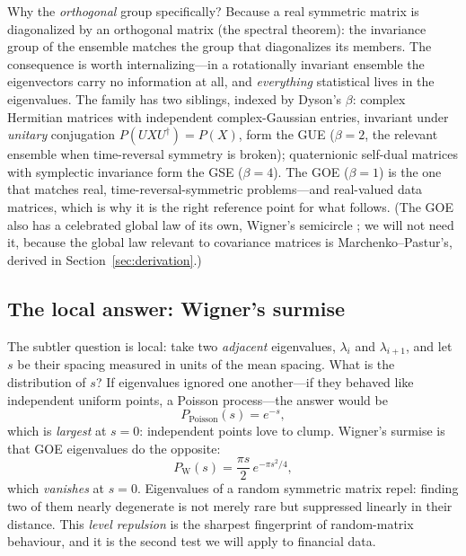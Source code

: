 \documentclass[11pt]{article}
\begin{document}
Why the \emph{orthogonal} group specifically? Because a real symmetric
matrix is diagonalized by an orthogonal matrix (the spectral theorem):
the invariance group of the ensemble matches the group that diagonalizes
its members. The consequence is worth internalizing---in a rotationally
invariant ensemble the eigenvectors carry no information at all, and
\emph{everything} statistical lives in the eigenvalues. The family has
two siblings, indexed by Dyson's $\beta$: complex Hermitian matrices with
independent complex-Gaussian entries, invariant under \emph{unitary}
conjugation $P(UXU^{\dagger})=P(X)$, form the GUE ($\beta=2$, the
relevant ensemble when time-reversal symmetry is broken); quaternionic
self-dual matrices with symplectic invariance form the GSE ($\beta=4$).
The GOE ($\beta=1$) is the one that matches real, time-reversal-symmetric
problems---and real-valued data matrices, which is why it is the right
reference point for what follows. (The GOE also has a celebrated global
law of its own, Wigner's semicircle \cite{wigner1958}; we will not need
it, because the global law relevant to covariance matrices is
Marchenko--Pastur's, derived in Section~\ref{sec:derivation}.)

\subsection{The local answer: Wigner's surmise}
\label{sec:surmise}

The subtler question is local: take two \emph{adjacent} eigenvalues,
$\lambda_{i}$ and $\lambda_{i+1}$, and let $s$ be their spacing measured in
units of the mean spacing. What is the distribution of $s$? If eigenvalues
ignored one another---if they behaved like independent uniform points, a
Poisson process---the answer would be
\begin{equation}
P_{\mathrm{Poisson}}(s)=e^{-s},
\end{equation}
which is \emph{largest} at $s=0$: independent points love to clump.
Wigner's surmise is that GOE eigenvalues do the opposite:
\begin{equation}
P_{\mathrm{W}}(s)=\frac{\pi s}{2}\,e^{-\pi s^{2}/4},
\label{eq:surmise}
\end{equation}
which \emph{vanishes} at $s=0$. Eigenvalues of a random symmetric matrix
repel: finding two of them nearly degenerate is not merely rare but
suppressed linearly in their distance. This \emph{level repulsion} is the
sharpest fingerprint of random-matrix behaviour, and it is the second test
we will apply to financial data.
\end{document}
